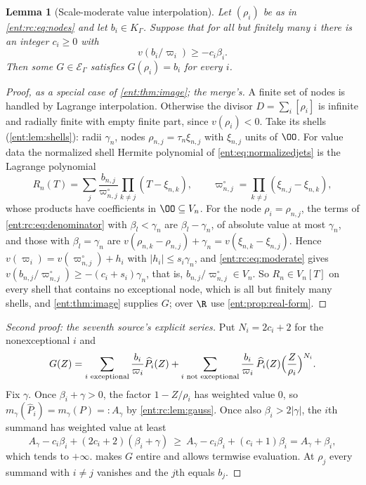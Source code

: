 \documentclass[11pt]{article}
\theoremstyle{plain}
\newtheorem{lemma}[lemma]{Lemma}
\theoremstyle{plain}
\theoremstyle{plain}
\theoremstyle{definition}
\theoremstyle{definition}
\theoremstyle{definition}
\theoremstyle{definition}
\theoremstyle{remark}
\newcommand{\K}{K_\Gamma}\newcommand{\KD}{K_\Delta}
\newcommand{\E}{\mathcal E_\Gamma}
\newcommand{\abs}[1]{\lvert#1\rvert}
\begin{document}
\begin{lemma}[Scale-moderate value interpolation]\label{ent:rc:lem:interpolation}
Let $(\rho_i)$ be as in \eqref{ent:rc:eq:nodes} and let $b_i\in\K$. Suppose
that for all but finitely many $i$ there is an integer $c_i\ge0$ with
\begin{equation}\label{ent:rc:eq:moderate}
 v(b_i/\varpi_i)\ge-c_i\beta_i .
\end{equation}
Then some $G\in\E$ satisfies $G(\rho_i)=b_i$ for every $i$.
\end{lemma}
\begin{proof}[Proof, as a special case of \cref{ent:thm:image}; the merge's]
A finite set of nodes is handled by Lagrange interpolation. Otherwise the
divisor $D=\sum_i[\rho_i]$ is infinite and radially finite with empty finite
part, since $v(\rho_i)<0$. Take its shells (\cref{ent:lem:shells}): radii
$\gamma_n$, nodes $\rho_{n,j}=\tau_n\xi_{n,j}$ with $\xi_{n,j}$ units of $\OO$.
For value data the normalized shell Hermite polynomial of
\eqref{ent:eq:normalizedjets} is the Lagrange polynomial
\[
 R_n(T)=\sum_j\frac{b_{n,j}}{\varpi^\circ_{n,j}}\prod_{k\ne j}(T-\xi_{n,k}),
 \qquad \varpi^\circ_{n,j}=\prod_{k\ne j}(\xi_{n,j}-\xi_{n,k}),
\]
whose products have coefficients in $\OO\subseteq V_n$. For the node
$\rho_i=\rho_{n,j}$, the terms of \eqref{ent:rc:eq:denominator} with
$\beta_l<\gamma_n$ are $\beta_l-\gamma_n$, of absolute value at most $\gamma_n$,
and those with $\beta_l=\gamma_n$ are $v(\rho_{n,k}-\rho_{n,j})+\gamma_n=
v(\xi_{n,k}-\xi_{n,j})$. Hence $v(\varpi_i)=v(\varpi^\circ_{n,j})+h_i$ with
$|h_i|\le s_i\gamma_n$, and \eqref{ent:rc:eq:moderate} gives
$v(b_{n,j}/\varpi^\circ_{n,j})\ge-(c_i+s_i)\gamma_n$, that is,
$b_{n,j}/\varpi^\circ_{n,j}\in V_n$. So $R_n\in V_n[T]$ on every shell that contains
no exceptional node, which is all but finitely many shells, and
\cref{ent:thm:image} supplies $G$; over $\R$ use \cref{ent:prop:real-form}.
\end{proof}
\begin{proof}[Second proof: the seventh source's explicit series]
Put $N_i=2c_i+2$ for the nonexceptional $i$ and
\begin{equation}\label{ent:rc:eq:cardinal}
 G(Z)=\sum_{i\text{ exceptional}}\frac{b_i}{\varpi_i}\widehat P_i(Z)
 +\sum_{i\text{ not exceptional}}
 \frac{b_i}{\varpi_i}\,\widehat P_i(Z)\Bigl(\frac Z{\rho_i}\Bigr)^{N_i}.
\end{equation}
Fix $\gamma$. Once $\beta_i+\gamma>0$, the factor $1-Z/\rho_i$ has weighted
value $0$, so $m_\gamma(\widehat P_i)=m_\gamma(P)=:A_\gamma$ by
\cref{ent:rc:lem:gauss}. Once also $\beta_i>2\abs\gamma$, the $i$th summand has
weighted value at least
\[
 A_\gamma-c_i\beta_i+(2c_i+2)(\beta_i+\gamma)
 \ \ge\ A_\gamma-c_i\beta_i+(c_i+1)\beta_i=A_\gamma+\beta_i ,
\]
which tends to $+\infty$.  makes $G$ entire and allows
termwise evaluation. At $\rho_j$ every summand with $i\ne j$ vanishes and the
$j$th equals $b_j$.
\end{proof}
\end{document}

